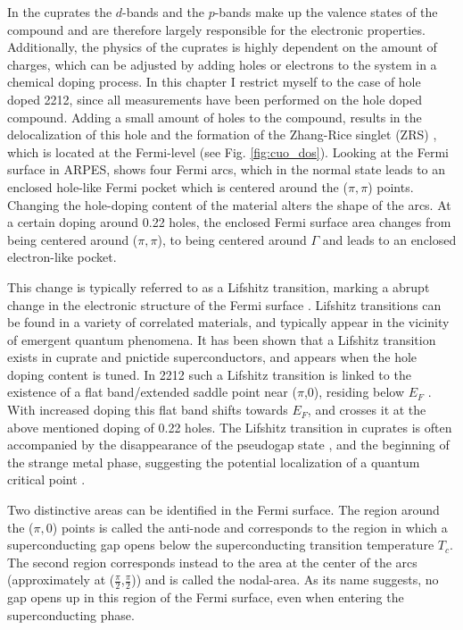 In the cuprates the  $d$-bands and the  $p$-bands make up the valence states of the compound and are therefore largely responsible for the electronic properties.
Additionally, the physics of the cuprates is highly dependent on the amount of charges, which can be adjusted by adding holes or electrons to the system in a chemical doping process.
In this chapter I restrict myself to the case of hole doped 2212, since all measurements have been performed on the hole doped compound.
Adding a small amount of holes to the compound, results in the delocalization of this hole and the formation of the Zhang-Rice singlet (ZRS) \cite{zhang_effective_1988}, which is located at the Fermi-level (see Fig. \ref{fig:cuo_dos}).
Looking at the Fermi surface in ARPES, shows four Fermi arcs, which in the normal state leads to an enclosed hole-like Fermi pocket which is centered around the ($\pi, \pi$) points.
Changing the hole-doping content of the material alters the shape of the arcs.
At a certain doping around 0.22 holes, the enclosed Fermi surface area changes from being centered around ($\pi, \pi$), to being centered around $\Gamma$ and leads to an enclosed electron-like pocket.

This change is typically referred to as a Lifshitz transition, marking a abrupt change in the electronic structure of the Fermi surface \cite{lifshitz_anomalies_1960}.
Lifshitz transitions can be found in a variety of correlated materials, and typically appear in the vicinity of emergent quantum phenomena.
It has been shown that a Lifshitz transition exists in cuprate and pnictide superconductors, and appears when the hole doping content is tuned.
In 2212 such a Lifshitz transition is linked to the existence of a flat band/extended saddle point near ($\pi$,$0$), residing below $E_F$ \cite{campuzano_photoemission_2004,gofron_observation_1994}.
With increased doping this flat band shifts towards $E_F$, and crosses it at the above mentioned doping of 0.22 holes.
The Lifshitz transition in cuprates is often accompanied by the disappearance of the pseudogap state \cite{matt_electron_2015,benhabib_collapse_2015}, and the beginning of the strange metal phase, suggesting the potential localization of a quantum critical point \cite{michon_thermodynamic_2019,chen_incoherent_2019,cooper_anomalous_2009,badoux_change_2016,putzke_reduced_2021}.

Two distinctive areas can be identified in the Fermi surface.
The region around the ($\pi, 0$) points is called the anti-node and corresponds to the region in which a superconducting gap opens below the superconducting transition temperature $T_c$.
The second region corresponds instead to the area at the center of the arcs (approximately at ($\frac{\pi}{2}$,$\frac{\pi}{2}$)) and is called the nodal-area.
As its name suggests, no gap opens up in this region of the Fermi surface, even when entering the superconducting phase.

